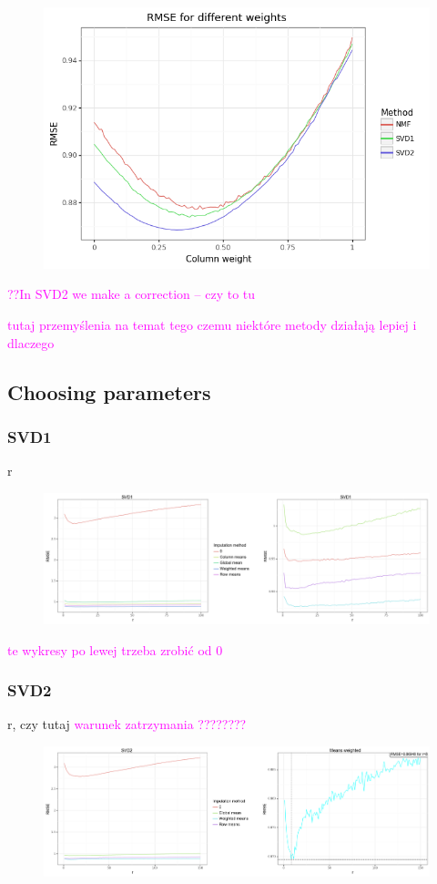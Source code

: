 \documentclass[11pt]{amsart}
\newcommand{\tami}[1]{{\textcolor{magenta}{#1}}}
\begin{document}
\begin{figure}[H]
\includegraphics[scale=0.6]{fig/syf/weights}
\label{fig:figure}
\end{figure}

\tami{??In SVD2 we make a correction -- czy to tu}

\tami{tutaj przemyślenia na temat tego czemu niektóre metody działają lepiej i dlaczego}

\subsection*{Choosing parameters}

\subsubsection*{SVD1} r
\begin{figure}[H]
\includegraphics[scale=0.45]{fig/syf/svd1_all}
\label{fig:figure}
\end{figure}
\tami{te wykresy po lewej trzeba zrobić od 0}

\subsubsection*{SVD2} r, czy tutaj \tami{warunek zatrzymania ????????}
\begin{figure}[H]
\includegraphics[scale=0.45]{fig/syf/svd2_all}
\label{fig:figure}
\end{figure}
\end{document}
